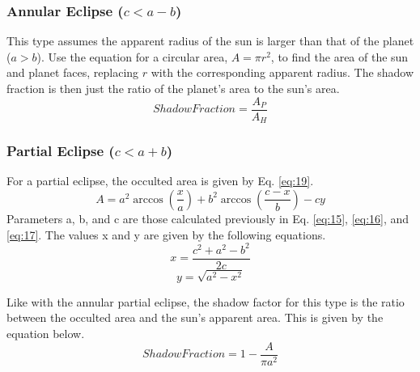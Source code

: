 \subsubsection{Annular Eclipse ($c < a-b$)}

This type assumes the apparent radius of the sun is larger than that of the planet ($a>b$). Use the equation for a circular area, $A = \pi r^2$, to find the area of the sun and planet faces, replacing $r$ with the corresponding apparent radius. The shadow fraction is then just the ratio of the planet's area to the sun's area.
\begin{equation} \label{eq:18}
Shadow Fraction = \frac{A_P}{A_H}
\end{equation}
\subsubsection{Partial Eclipse ($c < a+ b$)}

For a partial eclipse, the occulted area is given by Eq. \ref{eq:19}.
\begin{equation} \label{eq:19}
A = a^2 \arccos(\frac{x}{a}) + b^2 \arccos(\frac{c-x}{b}) - cy
\end{equation}
Parameters a, b, and c are those calculated previously in Eq. \ref{eq:15}, \ref{eq:16}, and \ref{eq:17}. The values x and y are given by the following equations.
\begin{equation}
x = \frac{c^2 + a^2 - b^2}{2c}
\end{equation}
\begin{equation}
y = \sqrt{a^2 - x^2}
\end{equation}

Like with the annular partial eclipse, the shadow factor for this type is the ratio between the occulted area and the sun's apparent area. This is given by the equation below.
\begin{equation}
Shadow Fraction = 1 - \frac{A}{\pi a^2}
\end{equation}